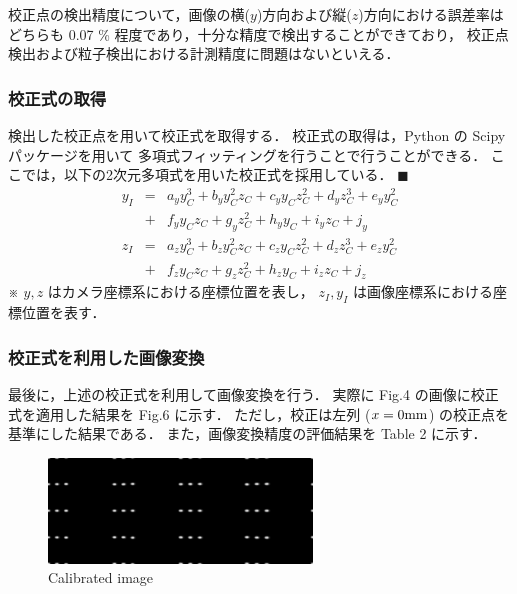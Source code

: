 \documentclass[twocolumn,a4j]{jsarticle}
\begin{document}
校正点の検出精度について，画像の横($y$)方向および縦($z$)方向における誤差率は
どちらも 0.07 \% 程度であり，十分な精度で検出することができており，
校正点検出および粒子検出における計測精度に問題はないといえる．

\newpage
\subsubsection{校正式の取得}
検出した校正点を用いて校正式を取得する．
校正式の取得は，Python の Scipy パッケージを用いて
多項式フィッティングを行うことで行うことができる．
ここでは，以下の2次元多項式を用いた校正式を採用している．
 \baselineskip
\noindent $\blacksquare$ 
\begin{eqnarray*}
  y_I &=& a_y y_C^3 + b_y y_C^2 z_C + c_y y_C z_C^2 + d_y z_C^3 + e_y y_C^2\\
  &+& f_y y_C z_C + g_y z_C^2 + h_y y_C + i_y z_C + j_y\\
  z_I &=& a_z y_C^3 + b_z y_C^2 z_C + c_z y_C z_C^2 + d_z z_C^3 + e_z y_C^2\\
  &+& f_z y_C z_C + g_z z_C^2 + h_z y_C + i_z z_C + j_z
\end{eqnarray*}
※ $y, z$ はカメラ座標系における座標位置を表し，
$z_I, y_I$ は画像座標系における座標位置を表す．

 \baselineskip
\subsubsection{校正式を利用した画像変換}
最後に，上述の校正式を利用して画像変換を行う．
実際に Fig.4 の画像に校正式を適用した結果を Fig.6 に示す．
ただし，校正は左列 ($x = 0 \rm{mm}$) の校正点を基準にした結果である．
また，画像変換精度の評価結果を Table 2 に示す．

\begin{figure}[htbp]
  \centering
  \includegraphics[keepaspectratio, width=70mm]{../images/Calibration/0.bmp}
  \caption{Calibrated image}
\end{figure}
\end{document}
